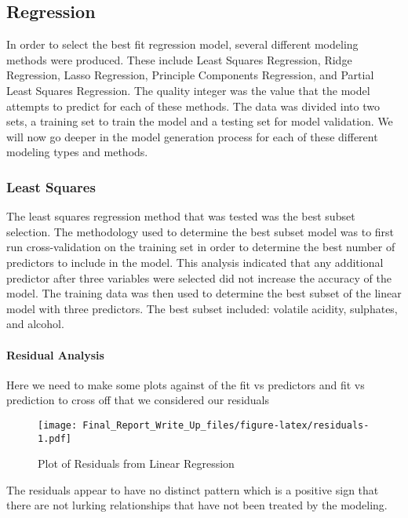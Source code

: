 \documentclass[]{article}
\let\oldparagraph\paragraph
\renewcommand{\paragraph}[1]{\oldparagraph{#1}\mbox{}}
\begin{document}
\subsection{Regression}\label{regression}

In order to select the best fit regression model, several different
modeling methods were produced. These include Least Squares Regression,
Ridge Regression, Lasso Regression, Principle Components Regression, and
Partial Least Squares Regression. The quality integer was the value that
the model attempts to predict for each of these methods. The data was
divided into two sets, a training set to train the model and a testing
set for model validation. We will now go deeper in the model generation
process for each of these different modeling types and methods.

\subsubsection{Least Squares}\label{least-squares}

The least squares regression method that was tested was the best subset
selection. The methodology used to determine the best subset model was
to first run cross-validation on the training set in order to determine
the best number of predictors to include in the model. This analysis
indicated that any additional predictor after three variables were
selected did not increase the accuracy of the model. The training data
was then used to determine the best subset of the linear model with
three predictors. The best subset included: volatile acidity, sulphates,
and alcohol.

\paragraph{Residual Analysis}\label{residual-analysis}

Here we need to make some plots against of the fit vs predictors and fit
vs prediction to cross off that we considered our residuals

\begin{figure}[htbp]
\centering
\texttt{[image: Final\_Report\_Write\_Up\_files/figure-latex/residuals-1.pdf]}
\caption{Plot of Residuals from Linear Regression}
\end{figure}

The residuals appear to have no distinct pattern which is a positive
sign that there are not lurking relationships that have not been treated
by the modeling.
\end{document}
